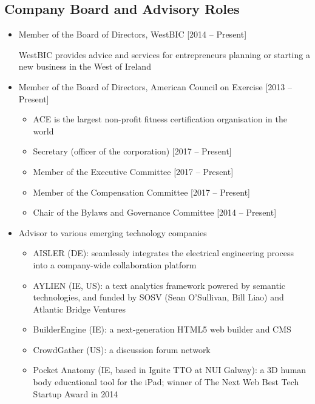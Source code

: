 \documentclass[10pt,a4paper]{res} %
\begin{document}
\begin{resume}
\subsection*{Company Board and Advisory Roles}

\begin{itemize} \itemsep -2pt
\item Member of the Board of Directors, WestBIC [2014 -- Present]
\begin{itemize} \itemsep -2pt
WestBIC provides advice and services for entrepreneurs planning or starting a new business in the West of Ireland
\end{itemize}
\item Member of the Board of Directors, American Council on Exercise [2013 -- Present]
\begin{itemize} \itemsep -2pt
\item ACE is the largest non-profit fitness certification organisation in the world
\item Secretary (officer of the corporation) [2017 -- Present]
\item Member of the Executive Committee [2017 -- Present]
\item Member of the Compensation Committee [2017 -- Present]
\item Chair of the Bylaws and Governance Committee [2014 -- Present]
\end{itemize}
\item Advisor to various emerging technology companies
\begin{itemize} \itemsep -2pt
\item AISLER (DE): seamlessly integrates the electrical engineering process into a company-wide collaboration platform
\item AYLIEN (IE, US): a text analytics framework powered by semantic technologies, and funded by SOSV (Sean O'Sullivan, Bill Liao) and Atlantic Bridge Ventures
\item BuilderEngine (IE): a next-generation HTML5 web builder and CMS
\item CrowdGather (US): a discussion forum network
\item Pocket Anatomy (IE, based in Ignite TTO at NUI Galway): a 3D human body educational tool for the iPad; winner of The Next Web Best Tech Startup Award in 2014
\end{itemize}
\end{itemize}



\end{resume}
\end{document}
